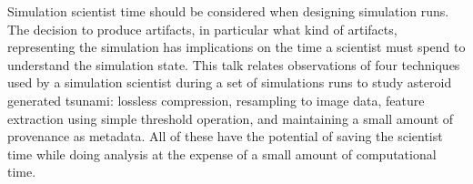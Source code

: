 \license



Simulation scientist time should be considered when designing simulation runs. The decision to produce artifacts, in particular what kind of artifacts, representing the simulation has implications on the time a scientist must spend to understand the simulation state. This talk relates observations of four techniques used by a simulation scientist during a set of simulations runs to study asteroid generated tsunami: lossless compression, resampling to image data, feature extraction using simple threshold operation, and maintaining a small amount of provenance as metadata. All of these have the potential of saving the scientist time while doing analysis at the expense of a small amount of computational time.

